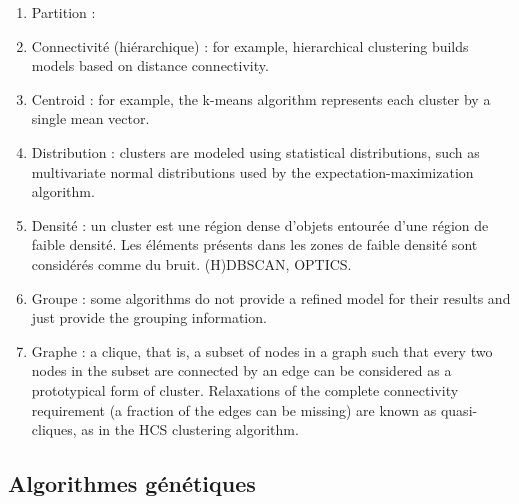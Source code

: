 \documentclass[draft]{llncs}
\begin{document}
\begin{enumerate}
  \item Partition : 
  \item Connectivité (hiérarchique) : for example, hierarchical clustering builds models based on distance connectivity.
  \item Centroid : for example, the k-means algorithm represents each cluster by a single mean vector.
  \item Distribution : clusters are modeled using statistical distributions, such as multivariate normal distributions used by the expectation-maximization algorithm.
  \item Densité : un cluster est une région dense d'objets entourée d'une région de faible densité. Les éléments présents dans les zones de faible densité sont considérés comme du bruit. (H)DBSCAN, OPTICS.
  \item Groupe : some algorithms do not provide a refined model for their results and just provide the grouping information.
  \item Graphe : a clique, that is, a subset of nodes in a graph such that every two nodes in the subset are connected by an edge can be considered as a prototypical form of cluster. Relaxations of the complete connectivity requirement (a fraction of the edges can be missing) are known as quasi-cliques, as in the HCS clustering algorithm.
\end{enumerate}



\subsection{Algorithmes génétiques}
 
\end{document}
